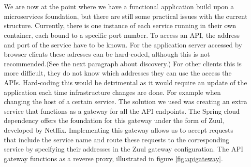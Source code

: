 \documentclass[12pt]{article}
\begin{document}
\begin{multicols}{2}
\\\\
We are now at the point where we have a functional application build upon a microservices foundation, but there are still some practical issues with the current structure. Currently, there is one instance of each service running in their own container, each bound to a specific port number. To access an API, the address and port of the service have to be known. For the application server accessed by browser clients these adresses can be hard-coded, although this is not recommended.(See the next paragraph about discovery.) For other clients this is more difficult, they do not know which addresses they can use the access the APIs. Hard-coding this would be detrimental as it would require an update of the application each time infrastructure changes are done. For example when changing the host of a certain service. The solution we used was creating an extra service that functions as a gateway for all the API endpoints. The Spring cloud dependency offers the foundation for this gateway under the form of Zuul, developed by Netflix. \cite{NetflixZuul76:online} Implementing this gateway allows us to accept requests that include the service name and route these requests to the corresponding service by specifying their addresses in the Zuul gateway configuration. The API gateway functions as a reverse proxy, illustrated in figure \ref{fig:apigateway}.




\end{multicols}
\end{document}
